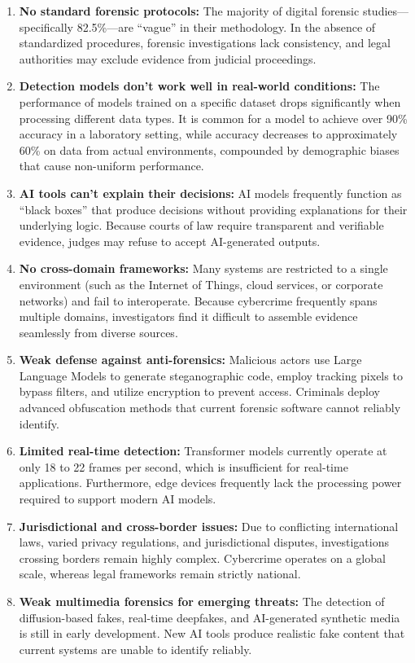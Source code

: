\documentclass[12pt,a4paper]{article}
\begin{document}
\begin{enumerate}
    \item \textbf{No standard forensic protocols:} The majority of digital forensic studies---specifically 82.5\%---are ``vague'' in their methodology. In the absence of standardized procedures, forensic investigations lack consistency, and legal authorities may exclude evidence from judicial proceedings.
    \item \textbf{Detection models don't work well in real-world conditions:} The performance of models trained on a specific dataset drops significantly when processing different data types. It is common for a model to achieve over 90\% accuracy in a laboratory setting, while accuracy decreases to approximately 60\% on data from actual environments, compounded by demographic biases that cause non-uniform performance.
    \item \textbf{AI tools can't explain their decisions:} AI models frequently function as ``black boxes'' that produce decisions without providing explanations for their underlying logic. Because courts of law require transparent and verifiable evidence, judges may refuse to accept AI-generated outputs.
    \item \textbf{No cross-domain frameworks:} Many systems are restricted to a single environment (such as the Internet of Things, cloud services, or corporate networks) and fail to interoperate. Because cybercrime frequently spans multiple domains, investigators find it difficult to assemble evidence seamlessly from diverse sources.
    \item \textbf{Weak defense against anti-forensics:} Malicious actors use Large Language Models to generate steganographic code, employ tracking pixels to bypass filters, and utilize encryption to prevent access. Criminals deploy advanced obfuscation methods that current forensic software cannot reliably identify.
    \item \textbf{Limited real-time detection:} Transformer models currently operate at only 18 to 22 frames per second, which is insufficient for real-time applications. Furthermore, edge devices frequently lack the processing power required to support modern AI models.
    \item \textbf{Jurisdictional and cross-border issues:} Due to conflicting international laws, varied privacy regulations, and jurisdictional disputes, investigations crossing borders remain highly complex. Cybercrime operates on a global scale, whereas legal frameworks remain strictly national.
    \item \textbf{Weak multimedia forensics for emerging threats:} The detection of diffusion-based fakes, real-time deepfakes, and AI-generated synthetic media is still in early development. New AI tools produce realistic fake content that current systems are unable to identify reliably.
\end{enumerate}
\end{document}

